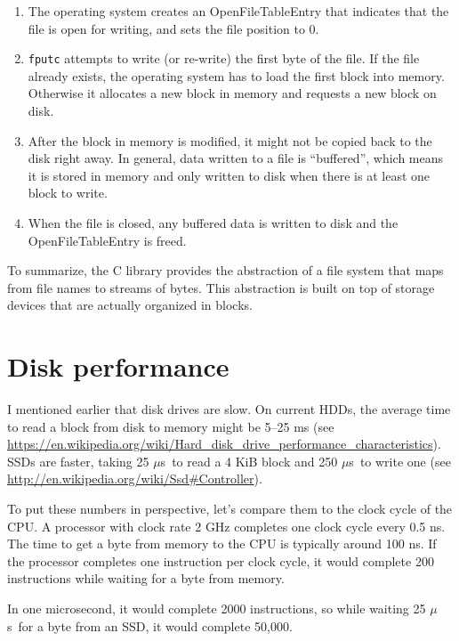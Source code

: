 \documentclass[12pt]{book}
\begin{document}
{\begin{enumerate}
\item The operating system creates an OpenFileTableEntry that
  indicates that the file is open for writing, and sets the file
  position to 0.

\item {\tt fputc} attempts to write (or re-write) the first byte of
  the file.  If the file already exists, the operating system has to
  load the first block into memory.  Otherwise it allocates a new
  block in memory and requests a new block on disk.

\item After the block in memory is modified, it might not be copied
  back to the disk right away.  In general, data written to a file is
  ``buffered'', which means it is stored in memory and only written to
  disk when there is at least one block to write.

\item When the file is closed, any buffered data is written to disk
  and the OpenFileTableEntry is freed.

\end{enumerate}

To summarize, the C library provides the abstraction of a file
system that maps from file names to streams of bytes.  This abstraction
is built on top of storage devices that are actually organized
in blocks.


\section{Disk performance}

\newcommand{\mus}{$\mu$s~}

I mentioned earlier that disk drives are slow.  On current HDDs, the
average time to read a block from disk to memory might be 5--25 ms
(see \url{https://en.wikipedia.org/wiki/Hard_disk_drive_performance_characteristics}).
SSDs are faster, taking 25 \mus to read a 4 KiB block and 250 \mus to
write one (see \url{http://en.wikipedia.org/wiki/Ssd#Controller}).

To put these numbers in perspective, let's compare them to the clock
cycle of the CPU.  A processor with clock rate 2 GHz completes one
clock cycle every 0.5 ns.  The time to get a byte from memory to
the CPU is typically around 100 ns.  If the processor completes one
instruction per clock cycle, it would complete 200 instructions
while waiting for a byte from memory.

In one microsecond, it would complete 2000 instructions,
so while waiting 25 \mus for a byte from an SSD, it would complete 50,000.

}
\end{document}
